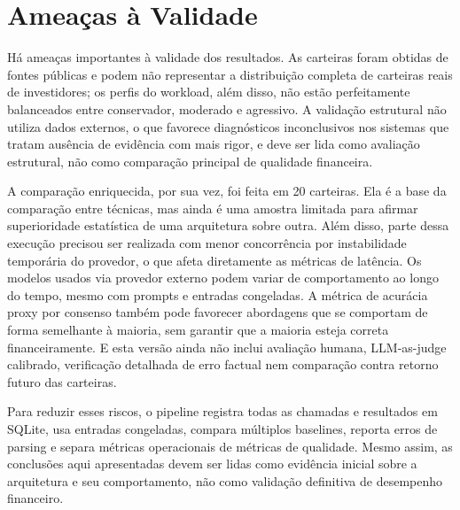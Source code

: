 \section{Ameaças à Validade}
\label{sec:ameacas}

Há ameaças importantes à validade dos resultados. As carteiras foram
obtidas de fontes públicas e podem não representar a distribuição
completa de carteiras reais de investidores; os perfis do workload,
além disso, não estão perfeitamente balanceados entre conservador,
moderado e agressivo. A validação estrutural não utiliza dados externos,
o que favorece diagnósticos inconclusivos nos sistemas que tratam
ausência de evidência com mais rigor, e deve ser lida como avaliação
estrutural, não como comparação principal de qualidade financeira.

A comparação enriquecida, por sua vez, foi feita em 20 carteiras. Ela é a
base da comparação entre técnicas, mas ainda é uma amostra limitada para
afirmar superioridade estatística de uma arquitetura sobre outra. Além
disso, parte dessa execução precisou ser realizada com menor concorrência
por instabilidade temporária do provedor, o que afeta diretamente as
métricas de latência. Os modelos usados via provedor externo podem variar
de comportamento ao longo do tempo, mesmo com prompts e entradas
congeladas. A métrica de acurácia proxy por consenso também pode favorecer
abordagens que se comportam de forma semelhante à maioria, sem garantir que
a maioria esteja correta financeiramente. E esta versão ainda não inclui
avaliação humana, LLM-as-judge calibrado, verificação detalhada de erro
factual nem comparação contra retorno futuro das carteiras.

Para reduzir esses riscos, o pipeline registra todas as chamadas e
resultados em SQLite, usa entradas congeladas, compara múltiplos
baselines, reporta erros de parsing e separa métricas operacionais de
métricas de qualidade. Mesmo assim, as conclusões aqui apresentadas
devem ser lidas como evidência inicial sobre a arquitetura e seu
comportamento, não como validação definitiva de desempenho financeiro.
